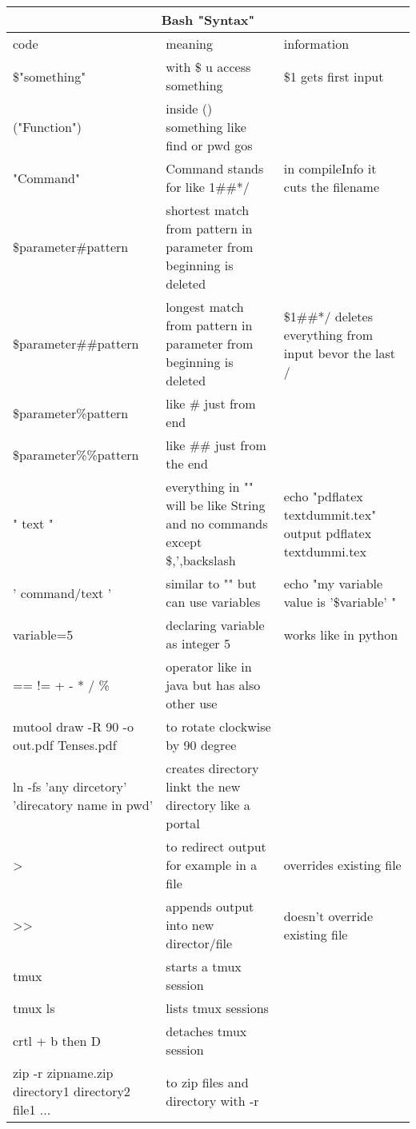 \documentclass[12pt]{article}
\begin{document}
\centering
\begin{tabular}{| p{6.5cm} | p{6.5cm} | p{6.5cm} |}
    \hline
    \multicolumn{3}{|c|}{Bash "Syntax"} \\
    \hline
    code & meaning & information\\
    \hline
    \$"something" & with \$ u access something & \$1 gets first input\\
    \hline
    ("Function") & inside () something like find or pwd gos &\\
    \hline
    {"Command"} & Command stands for like 1\#\#*/ & in compileInfo it cuts the filename \\
    \hline
    \${parameter\#pattern} & shortest match from pattern in parameter from beginning is deleted &\\
    \hline 
    \${parameter\#\#pattern} & longest match from pattern in parameter from beginning is deleted & \${1\#\#*/} deletes everything from input bevor the last / \\
    \hline
    \${parameter\%pattern} & like \# just from end &\\
    \hline 
    \${parameter\%\%pattern} & like \#\# just from the end &\\
    \hline 
    " text " & everything in "" will be like String and no commands except \$,',backslash & echo "pdflatex textdummit.tex" output pdflatex textdummi.tex \\
    \hline
    ' command/text ' & similar to "" but can use variables & echo "my variable value is '\$variable' " \\
    \hline 
    variable=5 & declaring variable as integer 5 & works like in python \\
    \hline 
    == != + - * / \% & operator like in java but has also other use &\\
    \hline 
    mutool draw -R 90 -o out.pdf Tenses.pdf & to rotate clockwise by 90 degree &\\
    \hline 
    ln -fs 'any dircetory' 'direcatory name in pwd' & creates directory linkt the new directory like a portal & \\
    \hline 
    > & to redirect output for example in a file & overrides existing file \\
    \hline
    >> & appends output into new director/file & doesn't override existing file \\
    \hline
    tmux & starts a tmux session \\
    \hline
    tmux ls & lists tmux sessions \\
    \hline 
    crtl + b then D & detaches tmux session \\
    \hline
    zip -r zipname.zip directory1 directory2 file1 ... & to zip files and directory with -r \\
    \hline



\end{tabular}
\end{document}
